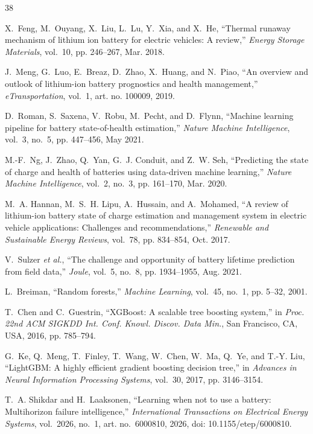 \documentclass[11pt,a4paper]{article}
\begin{document}
\begin{thebibliography}{38}

X.~Feng, M.~Ouyang, X.~Liu, L.~Lu, Y.~Xia, and X.~He, ``Thermal runaway mechanism of lithium ion battery for electric vehicles: A review,'' \emph{Energy Storage Materials}, vol.~10, pp. 246--267, Mar. 2018.

J.~Meng, G.~Luo, E.~Breaz, D.~Zhao, X.~Huang, and N.~Piao, ``An overview and outlook of lithium-ion battery prognostics and health management,'' \emph{eTransportation}, vol.~1, art. no. 100009, 2019.

D.~Roman, S.~Saxena, V.~Robu, M.~Pecht, and D.~Flynn, ``Machine learning pipeline for battery state-of-health estimation,'' \emph{Nature Machine Intelligence}, vol.~3, no.~5, pp. 447--456, May 2021.

M.-F.~Ng, J.~Zhao, Q.~Yan, G.~J. Conduit, and Z.~W. Seh, ``Predicting the state of charge and health of batteries using data-driven machine learning,'' \emph{Nature Machine Intelligence}, vol.~2, no.~3, pp. 161--170, Mar. 2020.

M.~A. Hannan, M.~S.~H. Lipu, A.~Hussain, and A.~Mohamed, ``A review of lithium-ion battery state of charge estimation and management system in electric vehicle applications: Challenges and recommendations,'' \emph{Renewable and Sustainable Energy Reviews}, vol.~78, pp. 834--854, Oct. 2017.

V.~Sulzer \emph{et al.}, ``The challenge and opportunity of battery lifetime prediction from field data,'' \emph{Joule}, vol.~5, no.~8, pp. 1934--1955, Aug. 2021.

L.~Breiman, ``Random forests,'' \emph{Machine Learning}, vol.~45, no.~1, pp. 5--32, 2001.

T.~Chen and C.~Guestrin, ``XGBoost: A scalable tree boosting system,'' in \emph{Proc. 22nd ACM SIGKDD Int. Conf. Knowl. Discov. Data Min.}, San Francisco, CA, USA, 2016, pp. 785--794.

G.~Ke, Q.~Meng, T.~Finley, T.~Wang, W.~Chen, W.~Ma, Q.~Ye, and T.-Y. Liu, ``LightGBM: A highly efficient gradient boosting decision tree,'' in \emph{Advances in Neural Information Processing Systems}, vol.~30, 2017, pp. 3146--3154.

T.~A. Shikdar and H.~Laaksonen, ``Learning when not to use a battery: Multihorizon failure intelligence,'' \emph{International Transactions on Electrical Energy Systems}, vol.~2026, no.~1, art. no.~6000810, 2026, doi: 10.1155/etep/6000810.


\end{thebibliography}
\end{document}
